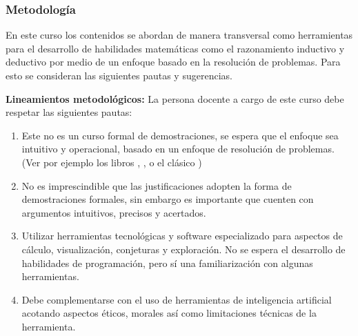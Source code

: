 \begin{refsection}
\begin{enumerate}
     
\end{enumerate}



\subsubsection*{Metodología}

En este curso los contenidos se abordan de manera transversal como herramientas para el desarrollo de habilidades matemáticas como el razonamiento inductivo y deductivo por medio de un enfoque basado en la resolución de problemas. Para esto se consideran las siguientes pautas y sugerencias.


\noindent \textbf{Lineamientos metodológicos:} La persona docente a cargo de este curso debe respetar las siguientes pautas:
\begin{enumerate}
    \item Este no es un curso formal de demostraciones, se espera que el enfoque sea intuitivo y operacional, basado en un enfoque de resolución de problemas. (Ver por ejemplo los libros \cite{Gri18}, \cite{MS17}, \cite{RT94} o el clásico \cite{Pol14})
    \item No es imprescindible que las justificaciones adopten la forma de demostraciones formales, sin embargo es importante que cuenten con argumentos intuitivos, precisos y acertados.
    \item Utilizar herramientas tecnológicas y software especializado para aspectos de cálculo, visualización, conjeturas y exploración. No se espera el desarrollo de habilidades de programación, pero sí una familiarización con algunas herramientas. 
    \item Debe complementarse con el uso de herramientas de inteligencia artificial acotando aspectos éticos, morales así como limitaciones técnicas de la herramienta.
\end{enumerate}




\end{refsection}
